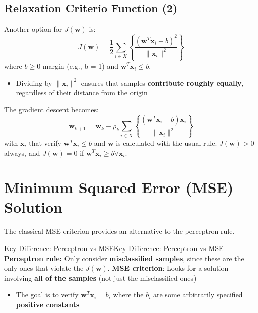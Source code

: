 \documentclass[a4paper]{article}
\theoremstyle{definition}
\begin{document}
\subsection{Relaxation Criterio Function (2)}
Another option for \( J(\mathbf{w}) \) is:
\[
  J(\mathbf{w}) = \frac{1}{2} \sum_{i \in X} \left\{ \frac{(\mathbf{w}^T \mathbf{x}_i - b)^2}{\parallel \mathbf{x}_i \parallel^2} \right\}
\]
where \( b \geq 0 \) margin (e.g., b = 1) and \( \mathbf{w}^T \mathbf{x}_i \leq b \).
\begin{itemize}
    \item Dividing by \( \parallel \mathbf{x}_i \parallel^2 \) ensures that samples \textbf{contribute roughly equally}, regardless of their distance from the origin 
\end{itemize}
The gradient descent becomes:
\[
  \mathbf{w}_{k + 1} = \mathbf{w}_k - \rho_k \sum_{i \in X} \left\{ \frac{(\mathbf{w}^T \mathbf{x}_i -b)\mathbf{x}_i}{\parallel \mathbf{x}_i \parallel^2} \right\}
\]
with \( \mathbf{x}_i \) that verify \( \mathbf{w}^T \mathbf{x}_i \leq b \) and \( \mathbf{w} \) is calculated with the usual rule.
\vspace{1em}
\noindent
\newline
\( J(\mathbf{w}) > 0 \) always, and \( J(\mathbf{w}) = 0 \) if \( \mathbf{w}^T \mathbf{x}_i \geq b \forall \mathbf{x}_i \).
\section{Minimum Squared Error (MSE) Solution}
The classical MSE criterion provides an alternative to the perceptron rule.
\begin{definition}{Key Difference: Perceptron vs MSE}{Key Difference: Perceptron vs MSE}
\textbf{Perceptron rule:} Only consider \textbf{misclassified samples}, since these are the only ones that violate the \( J(\mathbf{w}) \).
\newline 
\textbf{MSE criterion}: Looks for a solution involving \textbf{all of the samples} (not just the misclassified ones)
\begin{itemize}
    \item The goal is to verify \( \mathbf{w}^T \mathbf{x}_i = b_i \) where the \( b_i \) are some arbitrarily specified \textbf{positive constants}
\end{itemize}
\end{definition}
\end{document}
